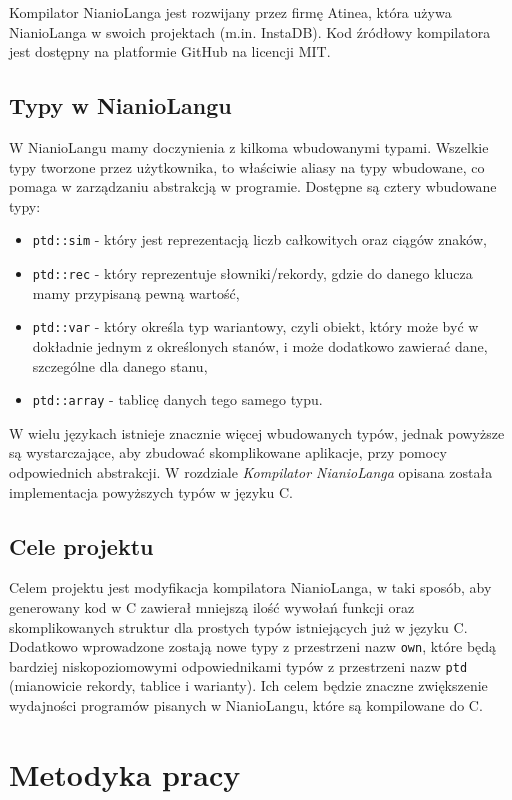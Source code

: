 \documentclass[licencjacka]{pracamgr}
\begin{document}
Kompilator NianioLanga jest rozwijany przez firmę Atinea, która używa NianioLanga w swoich projektach (m.in. InstaDB). Kod źródłowy kompilatora jest dostępny na platformie GitHub na licencji MIT.

\section{Typy w NianioLangu}
W NianioLangu mamy doczynienia z kilkoma wbudowanymi typami. Wszelkie typy tworzone przez użytkownika, to właściwie aliasy na typy wbudowane, co pomaga w zarządzaniu abstrakcją w programie. Dostępne są cztery wbudowane typy: 
\begin{itemize}
  \item \texttt{ptd::sim} - który jest reprezentacją liczb całkowitych oraz ciągów znaków,
  \item \texttt{ptd::rec} - który reprezentuje słowniki/rekordy, gdzie do danego klucza mamy przypisaną pewną wartość,
  \item \texttt{ptd::var} - który określa typ wariantowy, czyli obiekt, który może być w dokładnie jednym z określonych stanów, i może dodatkowo zawierać dane, szczególne dla danego stanu,
  \item \texttt{ptd::array} - tablicę danych tego samego typu.
\end{itemize}

W wielu językach istnieje znacznie więcej wbudowanych typów, jednak powyższe są wystarczające, aby zbudować skomplikowane aplikacje, przy pomocy odpowiednich abstrakcji. W rozdziale \textit{Kompilator NianioLanga} opisana została implementacja powyższych typów w języku C.

\section{Cele projektu}
Celem projektu jest modyfikacja kompilatora NianioLanga, w taki sposób, aby generowany kod w C zawierał mniejszą ilość wywołań funkcji oraz skomplikowanych struktur dla prostych typów istniejących już w języku C. Dodatkowo wprowadzone zostają nowe typy z przestrzeni nazw \texttt{own}, które będą bardziej niskopoziomowymi odpowiednikami typów z przestrzeni nazw \texttt{ptd} (mianowicie rekordy, tablice i warianty). Ich celem będzie znaczne zwiększenie wydajności programów pisanych w NianioLangu, które są kompilowane do C.

\chapter{Metodyka pracy}
\end{document}
